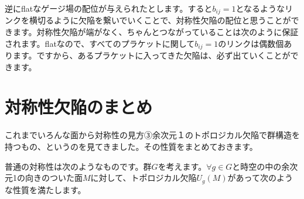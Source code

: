\documentclass[report,paper=a4, fontsize=12pt, line_length=16cm, number_of_lines=33,dvipdfmx]{jlreq}
\numberwithin{equation}{chapter}
\begin{document}
逆にflatなゲージ場の配位が与えられたとします。すると$b_{ij}=1$となるようなリンクを横切るように欠陥を繋いでいくことで、対称性欠陥の配位と思うことができます。対称性欠陥が端がなく、ちゃんとつながっていることは次のように保証されます。flatなので、すべてのプラケットに関して$b_{ij}=1$のリンクは偶数個あります。ですから、あるプラケットに入ってきた欠陥は、必ず出ていくことができます。

\section{対称性欠陥のまとめ}
これまでいろんな面から対称性の見方③余次元１のトポロジカル欠陥で群構造を持つもの、というのを見てきました。その性質をまとめておきます。

普通の対称性は次のようなものです。群$G$を考えます。$\forall g\in G$と時空の中の余次元1の向きのついた面$M$に対して、トポロジカル欠陥$U_{g}(M)$があって次のような性質を満たします。
\end{document}
